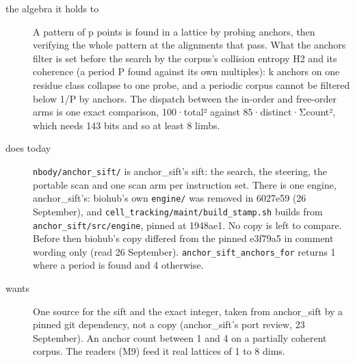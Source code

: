 \begin{description}
\item[{the algebra it holds to}] A pattern of p points is found in a lattice by probing anchors, then verifying the whole pattern at the alignments that pass. What the anchors filter is set before the search by the corpus's collision entropy H2 and its coherence (a period P found against its own multiples): k anchors on one residue class collapse to one probe, and a periodic corpus cannot be filtered below 1/P by anchors. The dispatch between the in-order and free-order arms is one exact comparison, 100·total² against 85·distinct·Σcount², which needs 143 bits and so at least 8 limbs.
\item[{does today}] \texttt{nbody/\allowbreak{}anchor\_\allowbreak{}sift/\allowbreak{}} is anchor\_\allowbreak{}sift's sift: the search, the steering, the portable scan and one scan arm per instruction set. There is one engine, anchor\_\allowbreak{}sift's: biohub's own \texttt{engine/\allowbreak{}} was removed in 6027e59 (26 September), and \texttt{cell\_\allowbreak{}tracking/\allowbreak{}maint/\allowbreak{}build\_\allowbreak{}stamp.\allowbreak{}sh} builds from \texttt{anchor\_\allowbreak{}sift/\allowbreak{}src/\allowbreak{}engine}, pinned at 1948ae1. No copy is left to compare. Before then biohub's copy differed from the pinned e3f79a5 in comment wording only (read 26 September). \texttt{anchor\_\allowbreak{}sift\_\allowbreak{}anchors\_\allowbreak{}for} returns 1 where a period is found and 4 otherwise.
\item[{wants}] One source for the sift and the exact integer, taken from anchor\_\allowbreak{}sift by a pinned git dependency, not a copy (anchor\_\allowbreak{}sift's port review, 23 September). An anchor count between 1 and 4 on a partially coherent corpus. The readers (M9) feed it real lattices of 1 to 8 dims.

\end{description}
